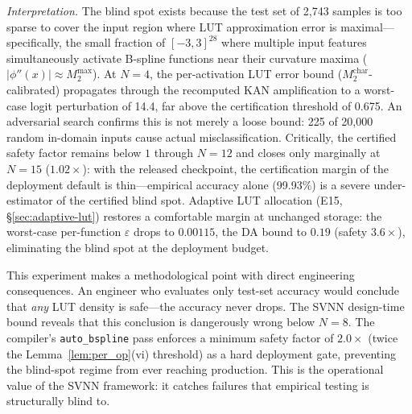 \documentclass[journal,onecolumn]{IEEEtran}
\begin{document}
\vspace{2pt}
\noindent\textit{Interpretation.}
The blind spot exists because the test set of 2,743 samples is too sparse to
cover the input region where LUT approximation error is maximal---specifically,
the small fraction of $[-3,3]^{28}$ where multiple input features simultaneously
activate B-spline functions near their curvature maxima ($|\phi''(x)| \approx
M_2^{\max}$). At $N=4$, the per-activation LUT error bound
($M_2^{\text{char}}$-calibrated) propagates through the recomputed KAN
amplification to a worst-case logit perturbation of 14.4, far above the
certification threshold of 0.675. An adversarial search confirms this is not
merely a loose bound: 225 of 20,000 random in-domain inputs cause actual
misclassification. Critically, the certified safety factor remains below $1$
through $N = 12$ and closes only marginally at $N=15$ ($1.02\times$): with the
released checkpoint, the certification margin of the deployment default is
thin---empirical accuracy alone (99.93\%) is a severe under-estimator of the
certified blind spot. Adaptive LUT allocation (E15,
{\S}\ref{sec:adaptive-lut}) restores a comfortable margin at unchanged
storage: the worst-case per-function $\varepsilon$ drops to $0.00115$, the
DA bound to $0.19$ (safety $3.6\times$), eliminating the blind spot at the
deployment budget.

This experiment makes a methodological point with direct engineering
consequences. An engineer who evaluates only test-set accuracy would conclude
that \textit{any} LUT density is safe---the accuracy never drops. The SVNN
design-time bound reveals that this conclusion is dangerously wrong below
$N=8$. The compiler's \texttt{auto\_bspline} pass enforces a minimum safety
factor of $2.0\times$ (twice the Lemma~\ref{lem:per_op}(vi) threshold) as a hard deployment
gate, preventing the blind-spot regime from ever reaching production.
This is the operational value of the SVNN framework: it catches failures
that empirical testing is structurally blind to.
\end{document}
